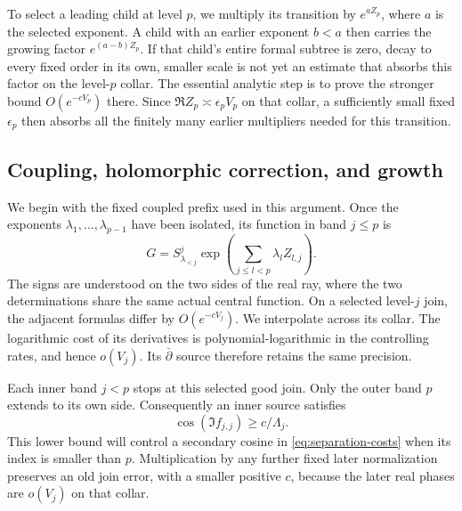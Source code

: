 To select a leading child at level $p$, we multiply its transition by
$e^{aZ_p}$, where $a$ is the selected exponent.  A child with an earlier
exponent $b<a$ then carries the growing factor $e^{(a-b)Z_p}$.
If that child's entire formal subtree is zero, decay to every fixed
order in its own, smaller scale is not yet an estimate that absorbs
this factor on the level-$p$ collar.  The essential analytic step is
to prove the stronger bound $O(e^{-cV_p})$ there.  Since
$\Re Z_p\asymp\epsilon_pV_p$ on that collar, a sufficiently small
fixed $\epsilon_p$ then absorbs all the finitely many earlier
multipliers needed for this transition.

\subsection{Coupling, holomorphic correction, and growth}

We begin with the fixed coupled prefix used in this argument.  Once
the exponents $\lambda_1,\ldots,\lambda_{p-1}$ have been isolated,
its function in band $j\leq p$ is
\begin{equation}\label{eq:separation-coupling}
 G=S^j_{\lambda_{<j}}
       \exp\!\left(\sum_{j\leq l<p}\lambda_lZ_{l,j}\right).
\end{equation}
The signs are understood on the two sides of the real ray, where
the two determinations share the same actual central function.
On a selected level-$j$ join, the adjacent formulas differ by
$O(e^{-cV_j})$.  We interpolate across its collar.  The logarithmic
cost of its derivatives is polynomial-logarithmic in the controlling
rates, and hence $o(V_j)$.  Its $\bar\partial$ source therefore
retains the same precision.

Each inner band $j<p$ stops at this selected good join.  Only the
outer band $p$ extends to its own side.  Consequently an inner
source satisfies
\begin{equation}\label{eq:separation-inner-cosine}
 \cos(\Im f_{j,j})\geq c/\Lambda_j.
\end{equation}
This lower bound will control a secondary cosine in
\eqref{eq:separation-costs} when its index is smaller than $p$.
Multiplication by any further fixed later normalization preserves
an old join error, with a smaller positive $c$, because the later
real phases are $o(V_j)$ on that collar.

